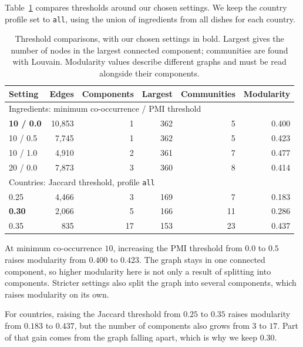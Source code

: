Table~\ref{tab:sensitivity} compares thresholds around our chosen settings.
We keep the country profile set to \texttt{all}, using the union of
ingredients from all dishes for each country.

\begin{table}[h]
\centering
\small
\setlength{\tabcolsep}{4pt}
\begin{tabular}{@{}l r r r r r@{}}
\toprule
Setting & Edges & Components & Largest & Communities & Modularity \\
\midrule
\multicolumn{6}{l}{Ingredients: minimum co-occurrence / PMI threshold} \\
\textbf{10 / 0.0} & 10{,}853 & 1 & 362 & 5 & 0.400 \\
10 / 0.5 & 7{,}745 & 1 & 362 & 5 & 0.423 \\
10 / 1.0 & 4{,}910 & 2 & 361 & 7 & 0.477 \\
20 / 0.0 & 7{,}873 & 3 & 360 & 8 & 0.414 \\
\midrule
\multicolumn{6}{l}{Countries: Jaccard threshold, profile \texttt{all}} \\
0.25 & 4{,}466 & 3 & 169 & 7 & 0.183 \\
\textbf{0.30} & 2{,}066 & 5 & 166 & 11 & 0.286 \\
0.35 & 835 & 17 & 153 & 23 & 0.437 \\
\bottomrule
\end{tabular}
\caption{Threshold comparisons, with our chosen settings in bold.
Largest gives the number of nodes in the largest connected component;
communities are found with Louvain. Modularity values describe different
graphs and must be read alongside their components.}
\label{tab:sensitivity}
\end{table}

At minimum co-occurrence $10$, increasing the PMI threshold from $0.0$ to
$0.5$ raises modularity from $0.400$ to $0.423$. The graph stays in one
connected component, so higher modularity here is not only a result of
splitting into components. Stricter settings also split the graph into
several components, which raises modularity on its own.

For countries, raising the Jaccard threshold from $0.25$ to $0.35$ raises
modularity from $0.183$ to $0.437$, but the number of components also grows
from $3$ to $17$. Part of that gain comes from the graph falling apart,
which is why we keep $0.30$.
